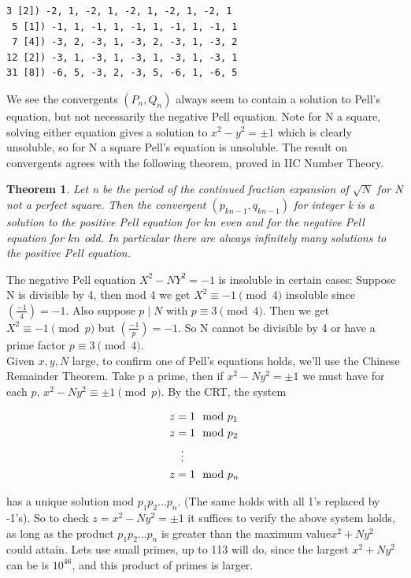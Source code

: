 \documentclass[10pt,a4paper]{report}
\newcommand{\legendre}[2]{(\frac{#1}{#2})}
\newtheorem*{theorem}{Theorem}
\begin{document}
\begin{lstlisting}[breaklines]
 3 [2]) -2, 1, -2, 1, -2, 1, -2, 1, -2, 1
 5 [1]) -1, 1, -1, 1, -1, 1, -1, 1, -1, 1
 7 [4]) -3, 2, -3, 1, -3, 2, -3, 1, -3, 2
12 [2]) -3, 1, -3, 1, -3, 1, -3, 1, -3, 1
31 [8]) -6, 5, -3, 2, -3, 5, -6, 1, -6, 5
\end{lstlisting}

We see the convergents $(P_n, Q_n)$ always seem to contain a solution to Pell's equation, but not necessarily the negative Pell equation.  Note for N a square, solving either equation gives a solution to $x^2-y^2=\pm 1$ which is clearly unsoluble, so for N a square Pell's equation is unsoluble. The result on convergents agrees with the following theorem, proved in IIC Number Theory.

\begin{theorem}
Let n be the period of the continued fraction expansion of $\sqrt{N}$ for N not a perfect square. Then the convergent $(p_{kn-1},q_{kn-1})$ for integer k is a solution to the positive Pell equation for $kn$ even and for the negative Pell equation for $kn$ odd. In particular there are always infinitely many solutions to the positive Pell equation.
\end{theorem}



The negative Pell equation $X^2-NY^2=-1$ is insoluble in certain cases: Suppose N is divisible by 4, then mod 4 we get $X^2\equiv-1\pmod 4$  insoluble since $(\frac{-1}{4})=-1$. Also suppose $p\mid N$ with $p\equiv 3 \pmod 4$. Then we get $X^2\equiv-1\pmod p$ but $\legendre{-1}{p}=-1$. So N cannot be divisible by 4 or have a prime factor $p\equiv 3\pmod 4$.\\

Given $x,y,N$ large, to confirm one of Pell's equations holds, we'll use the Chinese Remainder Theorem. Take p a prime, then if $x^2-Ny^2=\pm 1$ we must have for each $p$, $x^2-Ny^2\equiv\pm 1 \pmod{p}$. By the CRT, the system

\begin{align*}
   z &= 1 \mod p_1\\
   z &= 1 \mod p_2\\
   &\vdotswithin{=} \notag \\
   z &= 1 \mod p_n\\
\end{align*}

has a unique solution mod $p_1p_2\dots p_n$. (The same holds with all 1's replaced by -1's). So to check $z=x^2-Ny^2= \pm 1$ it suffices to verify the above system holds, as long as the product $p_1p_2\dots p_n$ is greater than the maximum value$x^2+Ny^2$ could attain. Lets use small primes, up to 113 will do, since the largest $x^2+Ny^2$ can be is $10^{46}$, and this product of primes is larger. \\
\end{document}
